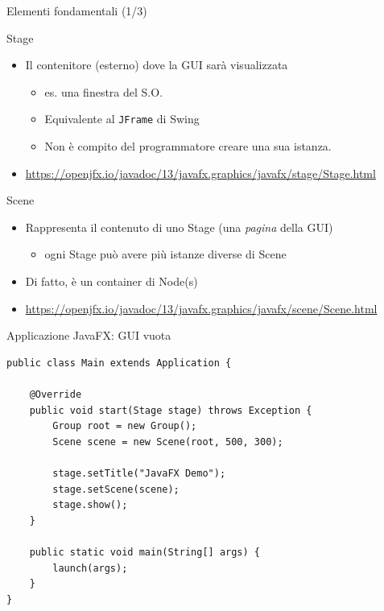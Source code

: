 \documentclass[presentation]{beamer}
\begin{document}
\begin{frame}{Elementi fondamentali (1/3)}
\begin{block}{Stage}
\begin{itemize}
\item Il contenitore (esterno) dove la GUI sarà visualizzata
\begin{itemize}
\item es. una finestra del S.O.
\item Equivalente al \texttt{JFrame} di Swing
\item Non è compito del programmatore creare una sua istanza.
\end{itemize}
\item \url{https://openjfx.io/javadoc/13/javafx.graphics/javafx/stage/Stage.html}
\end{itemize}
\end{block}

\begin{block}{Scene}
\begin{itemize}
\item Rappresenta il contenuto di uno Stage (una \emph{pagina} della GUI)
\begin{itemize}
\item ogni Stage può avere più istanze diverse di Scene
\end{itemize}
\item Di fatto, è un container di Node(s)
\item \url{https://openjfx.io/javadoc/13/javafx.graphics/javafx/scene/Scene.html}
\end{itemize}
\end{block}
\end{frame}

\begin{frame}[fragile]{Applicazione JavaFX: GUI vuota}
\begin{lstlisting}
public class Main extends Application {

	@Override
	public void start(Stage stage) throws Exception {
		Group root = new Group();
		Scene scene = new Scene(root, 500, 300);

		stage.setTitle("JavaFX Demo");
		stage.setScene(scene);
		stage.show();
	}

	public static void main(String[] args) {
		launch(args);
	}
}
\end{lstlisting}
\end{frame}
\end{document}
